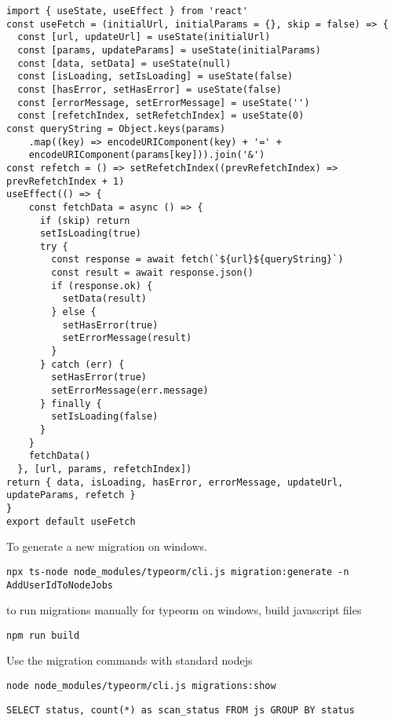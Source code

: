 

\begin{lstlisting}
import { useState, useEffect } from 'react'
const useFetch = (initialUrl, initialParams = {}, skip = false) => {
  const [url, updateUrl] = useState(initialUrl)
  const [params, updateParams] = useState(initialParams)
  const [data, setData] = useState(null)
  const [isLoading, setIsLoading] = useState(false)
  const [hasError, setHasError] = useState(false)
  const [errorMessage, setErrorMessage] = useState('')
  const [refetchIndex, setRefetchIndex] = useState(0)
const queryString = Object.keys(params)
    .map((key) => encodeURIComponent(key) + '=' +
    encodeURIComponent(params[key])).join('&')
const refetch = () => setRefetchIndex((prevRefetchIndex) => prevRefetchIndex + 1)
useEffect(() => {
    const fetchData = async () => {
      if (skip) return
      setIsLoading(true)
      try {
        const response = await fetch(`${url}${queryString}`)
        const result = await response.json()
        if (response.ok) {
          setData(result)
        } else {
          setHasError(true)
          setErrorMessage(result)
        }
      } catch (err) {
        setHasError(true)
        setErrorMessage(err.message)
      } finally {
        setIsLoading(false)
      }
    }
    fetchData()
  }, [url, params, refetchIndex])
return { data, isLoading, hasError, errorMessage, updateUrl, updateParams, refetch }
}
export default useFetch
\end{lstlisting}

To generate a new migration on windows.

\begin{lstlisting}
npx ts-node node_modules/typeorm/cli.js migration:generate -n AddUserIdToNodeJobs
\end{lstlisting}

to run migrations manually for typeorm on windows, build javascript files

\begin{lstlisting}
npm run build
\end{lstlisting}

Use the migration commands with standard nodejs
\begin{lstlisting}
node node_modules/typeorm/cli.js migrations:show
\end{lstlisting}

\begin{lstlisting}[caption={SQL Query Count}]
SELECT status, count(*) as scan_status FROM js GROUP BY status
\end{lstlisting}

